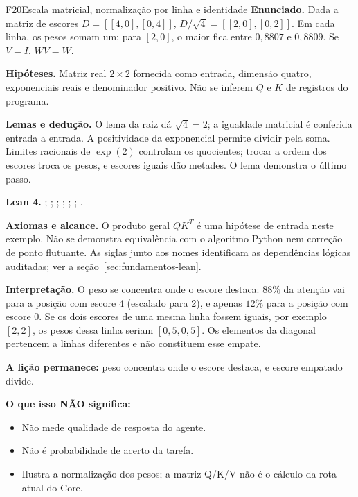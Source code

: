 \begin{formalizacao}{F20}{Escala matricial, normalização por linha e identidade}
\textbf{Enunciado.} Dada a matriz de escores $D=[[4,0],[0,4]]$, $D/\sqrt4=[[2,0],[0,2]]$. Em cada linha, os pesos somam um; para $[2,0]$, o maior fica entre $0{,}8807$ e $0{,}8809$. Se $V=I$, $WV=W$.

\textbf{Hipóteses.} Matriz real $2\times2$ fornecida como entrada, dimensão quatro, exponenciais reais e denominador positivo. Não se inferem $Q$ e $K$ de registros do programa.

\textbf{Lemas e dedução.} O lema da raiz dá $\sqrt4=2$; a igualdade matricial é conferida entrada a entrada. A positividade da exponencial permite dividir pela soma. Limites racionais de $\exp(2)$ controlam os quocientes; trocar a ordem dos escores troca os pesos, e escores iguais dão metades. O lema  demonstra o último passo.

\textbf{Lean 4.} ; ; ; ; ; ; .

\textbf{Axiomas e alcance.} O produto geral $QK^T$ é uma hipótese de entrada neste exemplo. Não se demonstra equivalência com o algoritmo Python nem correção de ponto flutuante. As siglas junto aos nomes identificam as dependências lógicas auditadas; ver a seção~\ref{sec:fundamentos-lean}.
\end{formalizacao}

\begin{descricao}
\textbf{Interpretação.} O peso se concentra onde o escore destaca: $88\%$ da atenção vai para a posição com escore 4 (escalado para 2), e apenas $12\%$ para a posição com escore 0. Se os dois escores de uma mesma linha fossem iguais, por exemplo $[2,2]$, os pesos dessa linha seriam $[0{,}5,0{,}5]$. Os elementos da diagonal pertencem a linhas diferentes e não constituem esse empate.

\textbf{A lição permanece:} peso concentra onde o escore destaca, e escore empatado divide.

\textbf{O que isso NÃO significa:}
\begin{itemize}[leftmargin=1.3em,itemsep=1pt]
  \item Não mede qualidade de resposta do agente.
  \item Não é probabilidade de acerto da tarefa.
  \item Ilustra a normalização dos pesos; a matriz Q/K/V não é o cálculo da rota atual do Core.
\end{itemize}
\end{descricao}

